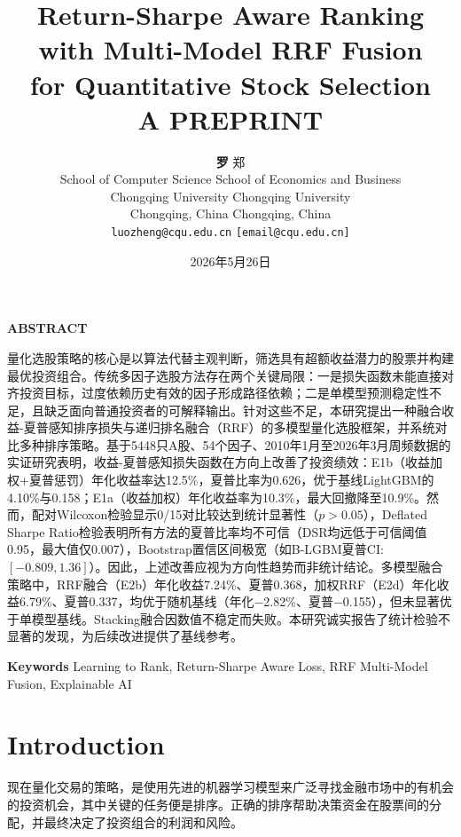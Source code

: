 \documentclass[11pt,a4paper]{ctexart}
\title{\LARGE Return-Sharpe Aware Ranking with Multi-Model RRF Fusion\\[0.3em]
\large for Quantitative Stock Selection\\[1em]
\normalsize A PREPRINT}
\author{
\textbf{罗} \hspace{2em} {郑}\\[0.3em]
\small School of Computer Science \hspace{2em} School of Economics and Business\\
\small Chongqing University \hspace{2em} Chongqing University\\
\small Chongqing, China \hspace{2em} Chongqing, China\\[0.3em]
\small \texttt{luozheng@cqu.edu.cn} \hspace{2em} \texttt{[email@cqu.edu.cn]}
}
\date{2026年5月26日}
\begin{document}
\maketitle
\thispagestyle{fancy}

\begin{center}
\textbf{\large ABSTRACT}
\end{center}
\vspace{-0.5em}

量化选股策略的核心是以算法代替主观判断，筛选具有超额收益潜力的股票并构建最优投资组合。传统多因子选股方法存在两个关键局限：一是损失函数未能直接对齐投资目标，过度依赖历史有效的因子形成路径依赖；二是单模型预测稳定性不足，且缺乏面向普通投资者的可解释输出。针对这些不足，本研究提出一种融合收益-夏普感知排序损失与递归排名融合（RRF）的多模型量化选股框架，并系统对比多种排序策略。基于5448只A股、54个因子、2010年1月至2026年3月周频数据的实证研究表明，收益-夏普感知损失函数在方向上改善了投资绩效：E1b（收益加权+夏普惩罚）年化收益率达12.5\%，夏普比率为0.626，优于基线LightGBM的4.10\%与0.158；E1a（收益加权）年化收益率为10.3\%，最大回撤降至10.9\%。然而，配对Wilcoxon检验显示0/15对比较达到统计显著性（$p>0.05$），Deflated Sharpe Ratio检验表明所有方法的夏普比率均不可信（DSR均远低于可信阈值0.95，最大值仅0.007），Bootstrap置信区间极宽（如B-LGBM夏普CI: $[-0.809, 1.36]$）。因此，上述改善应视为方向性趋势而非统计结论。多模型融合策略中，RRF融合（E2b）年化收益7.24\%、夏普0.368，加权RRF（E2d）年化收益6.79\%、夏普0.337，均优于随机基线（年化$-$2.82\%、夏普$-$0.155），但未显著优于单模型基线。Stacking融合因数值不稳定而失败。本研究诚实报告了统计检验不显著的发现，为后续改进提供了基线参考。

\vspace{1em}
\noindent\textbf{Keywords} \hspace{0.5em}  Learning to Rank, Return-Sharpe Aware Loss, RRF Multi-Model Fusion, Explainable AI

\vspace{1.5em}

\section{Introduction}

现在量化交易的策略，是使用先进的机器学习模型来广泛寻找金融市场中的有机会的投资机会，其中关键的任务便是排序。正确的排序帮助决策资金在股票间的分配，并最终决定了投资组合的利润和风险。
\end{document}
